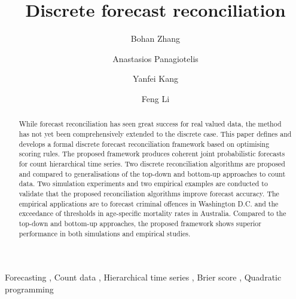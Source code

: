 \documentclass[a4paper,review,12pt,authoryear]{elsarticle}
\begin{document}
\begin{frontmatter}

  \title{Discrete forecast reconciliation}

  \author[label1]{Bohan Zhang}
  \address[label1]{School of Economics and Management, Beihang University, Beijing, China}
  \author[label2]{Anastasios Panagiotelis}
  \author[label1]{Yanfei Kang}
  
  \author[label3]{Feng Li}

  \address[label2]{The University of Sydney Business School, NSW 2006, Australia}
  \address[label3]{School of Statistics and Mathematics, Central University of Finance and Economics, Beijing, China}

  \begin{abstract}

    While forecast reconciliation has seen great success for real valued data, the method has not yet been comprehensively extended to the discrete case. This paper defines and develops a formal discrete forecast reconciliation framework based on optimising scoring rules. The proposed framework produces coherent joint probabilistic forecasts for count hierarchical time series.
    Two discrete reconciliation algorithms are proposed and compared to generalisations of the top-down and bottom-up approaches to count data. Two simulation experiments and two empirical examples are conducted to validate that the proposed reconciliation algorithms improve forecast accuracy. The empirical applications are to forecast  criminal offences in Washington D.C. and the exceedance of thresholds in age-specific mortality rates in Australia. Compared to the top-down and bottom-up approaches, the proposed framework shows superior performance in both simulations and empirical studies.
    
  \end{abstract}

  \begin{keyword}
  Forecasting \sep
  Count data \sep
  Hierarchical time series \sep
  Brier score \sep
  Quadratic programming
  \end{keyword}
  
\end{frontmatter}

\newpage
\end{document}
